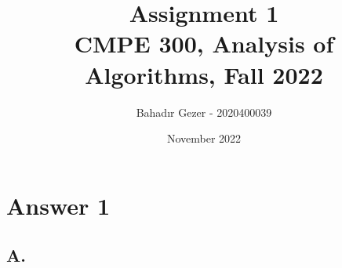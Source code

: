 \documentclass{article}
\title{
\vspace{-1cm} 
\Huge Assignment 1\\
\LARGE CMPE 300, Analysis of Algorithms, Fall 2022
}
\author{Bahadır Gezer - 2020400039}
\date{November 2022}
\begin{document}
\maketitle

\section*{Answer 1}
\subsection*{A.}

\iffalse
Evaluate the upper bound limit when $n > n_{0}$ for some $c_{2}, n_{0} > 0$ \\
\begin{align*}
\lim _{n \to \infty } n^{4}log(n^{8}n!) + 4n^{3} &\le \lim _{n \to \infty } c_{2}n^{5}log n && \text{Upper bound limit} \\
\lim _{n \to \infty } \frac{n^{4}log(n^{8}n!) + 4n^{3}} {n^{5}log n} &\le \lim _{n \to \infty } c_{2} && \text{Sum rule \& evaluate limit} \\ 
\lim _{n \to \infty } \frac{n^{4}log(n^{8}n!)} {n^{5}log n} + \lim _{n \to \infty } \frac{4n^{3}} {n^{5}log n} &\le c_{2} && \text{Simplify $n$'s} \\
\lim _{n \to \infty } \frac{log(n^{8}n!)} {n log n} + \lim _{n \to \infty } \frac{4} {n^{2}log n} &\le c_{2} && \text{Evaluate limit} \\
\lim _{n \to \infty } \frac{log(n^{8}n!)} {n log n} + 0 &\le c_{2} && \text{Stirling's formula} \\
\lim _{n \to \infty }\frac{log\left( n^{8}\sqrt{2\pi n}\left(\frac{n}{e}\right)^{n}\right)} {n log n} &\le c_{2} && \text{L'Hôpital's rule} \\
\lim _{n \to \infty }\frac{log n + \frac{17}{2n}} {log n + 1} &\le c_{2} && \text{L'Hôpital's rule} \\
\lim _{n \to \infty } \frac{\frac{1}{n} - \frac{17}{2n^{2}}} {\frac{1}{n}} &\le c_{2} && \text{Multiply by $\frac{n}{n}$} \\
\lim _{n \to \infty } \left(1 - \frac{17}{2n}\right) &\le c_{2} && \text{Sum rule} \\
\lim _{n \to \infty } 1 - \lim _{n \to \infty } \frac{17}{2n} &\le c_{2} && \text{Evaluate limit} \\
1 - \lim _{n \to \infty } \frac{17}{2n} &\le c_{2} && \text{Evaluate limit} \\
1 - 0 &\le c_{2} && \text{} \\
1 &\le c_{2} && \text{} 
\end{align*}
\fi
\end{document}
